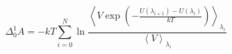 


\[ \Delta_0^1 A = - kT \sum_{i=0}^N \ln \frac{\left< V \exp \left( -
    \frac{U(\lambda_{i+1}) - U(\lambda_i)}{kT} \right)
\right>_{\lambda_i}}{\left< V \right>_{\lambda_i}} \]


